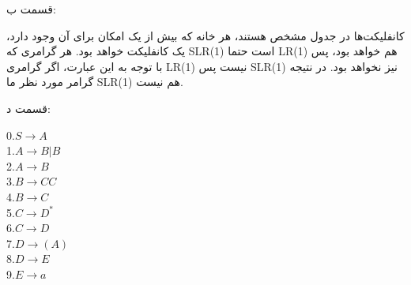 قسمت ب:

کانفلیکت‌ها در جدول مشخص هستند، هر خانه که بیش از یک امکان برای آن وجود دارد، یک کانفلیکت خواهد بود.
هر گرامری که SLR(1) است حتما LR(1) هم خواهد بود، پس با توجه به این عبارت، اگر گرامری LR(1) نیست پس SLR(1) نیز نخواهد بود.
در نتیجه گرامر مورد نظر ما SLR(1) هم نیست.

قسمت د:

\begin{center}
    \begin{latin}
    0.$S \rightarrow A$
    \\
    1.$A \rightarrow B|B$
    \\
    2.$A \rightarrow B$
    \\
    3.$B \rightarrow CC$
    \\
    4.$B \rightarrow C$
    \\
    5.$C \rightarrow {D}^{*}$
    \\
    6.$C \rightarrow D$
    \\
    7.$D \rightarrow (A)$
    \\
    8.$D \rightarrow E$
    \\
    9.$E \rightarrow a$
    \\
    \end{latin}
\end{center}